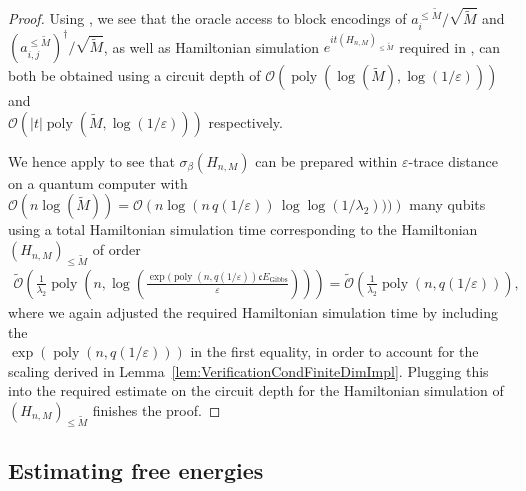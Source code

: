 \documentclass[11pt]{amsart}
\newcommand{\1}{\mathbbm{1}}
\newcommand{\eps}{\varepsilon}
\theoremstyle{plain}
\theoremstyle{definition}
\theoremstyle{remark}
\numberwithin{equation}{section}
\begin{document}
\begin{proof}
Using \cite[Remark 4.29 \&  4.30]{BeckerRouzeSalzmannToAppearcmp}, we see that the oracle access to block encodings of $a_i^{\le \widetilde M}/\sqrt{\widetilde M}$ and $\left(a_{i,j}^{\le \widetilde M}\right)^{\dagger}/\sqrt{\widetilde M}$, as well as Hamiltonian simulation $e^{it(H_{n,M})_{\le \widetilde M}}$ required in \cite[Corollary 4.33]{BeckerRouzeSalzmannToAppearcmp}, can both be obtained using a circuit depth of $\mathcal{O}\left(\operatorname{poly}(\log(\widetilde M),\log(1/\eps))\right)$  and \\$\mathcal{O}\left(|t|\operatorname{poly}(\widetilde M,\log(1/\eps))\right)$ respectively.

 We hence apply \cite[Corollary 4.33]{BeckerRouzeSalzmannToAppearcmp} to see that  $\sigma_\beta(H_{n,M})$ can be prepared within $\eps$-trace distance on a quantum computer with $\mathcal{O}(n\log(\widetilde M))=\mathcal{O}\left(n\log (n\,q(1/\eps))\,\log\log(1/\lambda_2)))\right)$ many qubits using a total Hamiltonian simulation time corresponding to the Hamiltonian $(H_{n,M})_{\le \widetilde M}$ of order
\begin{align*}
   \widetilde{ \mathcal{O}}\left(\frac{1}{\lambda_2}\operatorname{poly}\left(n, \log\left(\frac{\exp(\operatorname{poly}(n,q(1/\eps))\mathfrak{c}E_{\operatorname{Gibbs}}}{\eps}\right)\right)\right) =
   \widetilde{ \mathcal{O}}\left(\frac{1}{\lambda_2}\operatorname{poly}\left(n, q(1/\eps)\right)\right),
\end{align*} 
where we again adjusted the required Hamiltonian simulation time by including the \\$\exp(\operatorname{poly}(n,q(1/\eps)))$ in the first equality, in order to account for the scaling derived in Lemma~\ref{lem:VerificationCondFiniteDimImpl}.
Plugging this into the required estimate on the circuit depth for the Hamiltonian simulation of $(H_{n,M})_{\le \widetilde M}$ finishes the proof.
\end{proof}















\subsection{Estimating free energies}
\label{sec:eff_impl}
\end{document}
